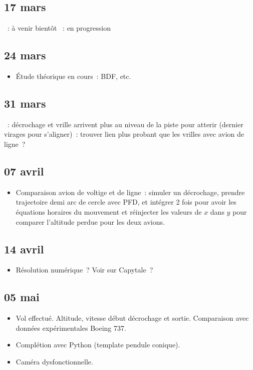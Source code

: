 \documentclass[a4paper, 11pt, final, garamond]{book}
\begin{document}
\subsection{17 mars}
\begin{itemize}
    ~: à venir bientôt
    ~: en progression
\end{itemize}

\subsection{24 mars}
\begin{itemize}
    \item Étude théorique en cours~: BDF, etc.
\end{itemize}

\subsection{31 mars}
\begin{itemize}
  ~: décrochage et vrille arrivent plus au niveau de la piste
    pour atterir (dernier virages pour s'aligner)~: trouver lien plus probant
    que les vrilles avec avion de ligne~?
\end{itemize}

\subsection{07 avril}
\begin{itemize}
  \item Comparaison avion de voltige et de ligne~: simuler un décrochage,
    prendre trajectoire demi arc de cercle avec PFD, et intégrer 2 fois pour
    avoir les équations horaires du mouvement et réinjecter les valeurs de $x$
    dans $y$ pour comparer l'altitude perdue pour les deux avions.
\end{itemize}

\subsection{14 avril}
\begin{itemize}
  \item Résolution numérique~? Voir sur Capytale~?
\end{itemize}

\subsection{05 mai}
\begin{itemize}
  \item Vol effectué. Altitude, vitesse début décrochage et sortie. Comparaison
    avec données expérimentales Boeing 737.
  \item Complétion avec Python (template pendule conique).
  \item Caméra dysfonctionnelle.
\end{itemize}
\end{document}
